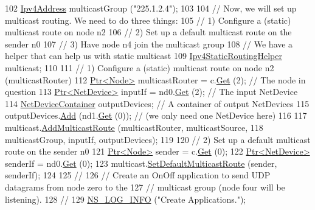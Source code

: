 \begin{DoxyCode}
102   \hyperlink{classns3_1_1Ipv4Address}{Ipv4Address} multicastGroup (\textcolor{stringliteral}{"225.1.2.4"});
103 
104   \textcolor{comment}{// Now, we will set up multicast routing.  We need to do three things:}
105   \textcolor{comment}{// 1) Configure a (static) multicast route on node n2}
106   \textcolor{comment}{// 2) Set up a default multicast route on the sender n0 }
107   \textcolor{comment}{// 3) Have node n4 join the multicast group}
108   \textcolor{comment}{// We have a helper that can help us with static multicast}
109   \hyperlink{classns3_1_1Ipv4StaticRoutingHelper}{Ipv4StaticRoutingHelper} multicast;
110 
111   \textcolor{comment}{// 1) Configure a (static) multicast route on node n2 (multicastRouter)}
112   \hyperlink{classns3_1_1Ptr}{Ptr<Node>} multicastRouter = c.\hyperlink{classns3_1_1NodeContainer_a9ed96e2ecc22e0f5a3d4842eb9bf90bf}{Get} (2);  \textcolor{comment}{// The node in question}
113   \hyperlink{classns3_1_1Ptr}{Ptr<NetDevice>} inputIf = nd0.\hyperlink{classns3_1_1NetDeviceContainer_a677d62594b5c9d2dea155cc5045f4d0b}{Get} (2);  \textcolor{comment}{// The input NetDevice}
114   \hyperlink{classns3_1_1NetDeviceContainer}{NetDeviceContainer} outputDevices;  \textcolor{comment}{// A container of output NetDevices}
115   outputDevices.\hyperlink{classns3_1_1NetDeviceContainer_a7ca8bc1d7ec00fd4fcc63869987fbda5}{Add} (nd1.\hyperlink{classns3_1_1NetDeviceContainer_a677d62594b5c9d2dea155cc5045f4d0b}{Get} (0));  \textcolor{comment}{// (we only need one NetDevice here)}
116 
117   multicast.\hyperlink{classns3_1_1Ipv4StaticRoutingHelper_aa8d55f28361e24aefb961fe2eddc2192}{AddMulticastRoute} (multicastRouter, multicastSource, 
118                                multicastGroup, inputIf, outputDevices);
119 
120   \textcolor{comment}{// 2) Set up a default multicast route on the sender n0 }
121   \hyperlink{classns3_1_1Ptr}{Ptr<Node>} sender = c.\hyperlink{classns3_1_1NodeContainer_a9ed96e2ecc22e0f5a3d4842eb9bf90bf}{Get} (0);
122   \hyperlink{classns3_1_1Ptr}{Ptr<NetDevice>} senderIf = nd0.\hyperlink{classns3_1_1NetDeviceContainer_a677d62594b5c9d2dea155cc5045f4d0b}{Get} (0);
123   multicast.\hyperlink{classns3_1_1Ipv4StaticRoutingHelper_ae69a07ded3139dfd4e21bb7c10eba416}{SetDefaultMulticastRoute} (sender, senderIf);
124 
125   \textcolor{comment}{//}
126   \textcolor{comment}{// Create an OnOff application to send UDP datagrams from node zero to the}
127   \textcolor{comment}{// multicast group (node four will be listening).}
128   \textcolor{comment}{//}
129   \hyperlink{group__logging_gafbd73ee2cf9f26b319f49086d8e860fb}{NS\_LOG\_INFO} (\textcolor{stringliteral}{"Create Applications."});

\end{DoxyCode}
